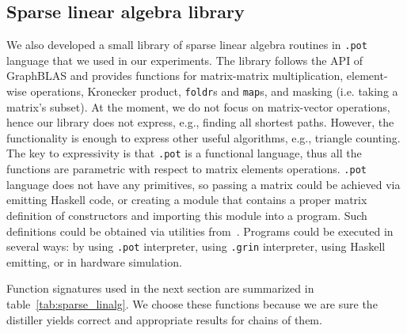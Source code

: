 \subsection{Sparse linear algebra library}

We also developed a small library of sparse linear algebra routines in \texttt{.pot} language that we used in our experiments. The library follows the API of GraphBLAS and provides functions for matrix-matrix multiplication, element-wise operations, Kronecker product, \texttt{foldr}s and \texttt{map}s, and masking (i.e. taking a matrix's subset). At the moment, we do not focus on matrix-vector operations, hence our library does not express, e.g., finding all shortest paths. However, the functionality is enough to express other useful algorithms, e.g., triangle counting. The key to expressivity is that \texttt{.pot} is a functional language, thus all the functions are parametric with respect to matrix elements operations.
\texttt{.pot} language does not have any primitives, so passing a matrix could be achieved via emitting Haskell code, or creating a module that contains a proper matrix definition of constructors and importing this module into a program. Such definitions could be obtained via utilities from~\cite{matrix-rep}. Programs could be executed in several ways: by using \texttt{.pot} interpreter, using \texttt{.grin} interpreter, using Haskell emitting, or in hardware simulation.

Function signatures used in the next section are summarized in table~\ref{tab:sparse_linalg}. We choose these functions because we are sure the distiller yields correct and appropriate results for chains of them.